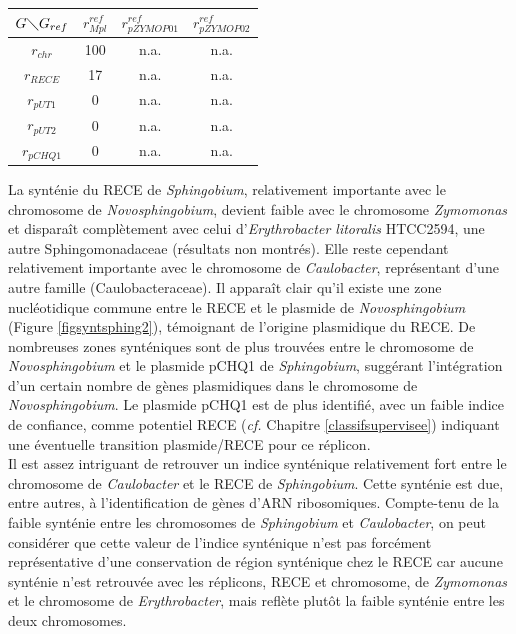 \begin{table}[H]
\begin{minipage}[t]{0.45\textwidth}
\begin{tabular}{c|ccc}
		$G \diagdown G_{ref}$ & $r^{ref}_{Mpl}$ & $r^{ref}_{pZYMOP01}$ & $r^{ref}_{pZYMOP02}$ \\
		\hline
		$r_{chr}$ & 100 & n.a. & n.a.\\
		$ r_{RECE}$ & 17 & n.a. & n.a. \\
		$r_{pUT1}$ & 0 & n.a. & n.a.\\ 
		$r_{pUT2}$ & 0 & n.a. & n.a.\\ 
		$r_{pCHQ1}$ & 0 & n.a. & n.a.\\ 
		\end{tabular}
	 \label{tablesyntsphing3}
	\end{minipage}
\end{table}

   La synténie du RECE de \textit{Sphingobium}, relativement importante avec le chromosome de \textit{Novosphingobium}, devient faible avec le chromosome \textit{Zymomonas} et disparaît complètement avec celui d'\textit{Erythrobacter litoralis} HTCC2594, une autre Sphingomonadaceae (résultats non montrés). Elle reste cependant relativement importante avec le chromosome de \textit{Caulobacter}, représentant d'une autre famille (Caulobacteraceae). Il apparaît clair qu'il existe une zone nucléotidique commune entre le RECE et le plasmide de \textit{Novosphingobium} (Figure \ref{figsyntsphing2}), témoignant de l'origine plasmidique du RECE. De nombreuses zones synténiques sont de plus trouvées entre le chromosome de \textit{Novosphingobium} et le plasmide pCHQ1 de \textit{Sphingobium}, suggérant l'intégration d'un certain nombre de gènes plasmidiques dans le chromosome de \textit{Novosphingobium}. Le plasmide pCHQ1 est de plus identifié, avec un faible indice de confiance, comme potentiel RECE (\textit{cf.} Chapitre \ref{classifsupervisee}) indiquant une éventuelle transition plasmide/RECE pour ce réplicon.\\
    Il est assez intriguant de retrouver un indice synténique relativement fort entre le chromosome de \textit{Caulobacter} et le RECE de \textit{Sphingobium}. Cette synténie est due, entre autres, à l'identification de gènes d'ARN ribosomiques. Compte-tenu de la faible synténie entre les chromosomes de \textit{Sphingobium} et \textit{Caulobacter}, on peut considérer que cette valeur de l'indice synténique n'est pas forcément représentative d'une conservation de région synténique chez le RECE car aucune synténie n'est retrouvée avec les réplicons, RECE et chromosome, de \textit{Zymomonas} et le chromosome de \textit{Erythrobacter}, mais reflète plutôt la faible synténie entre les deux chromosomes. 
        

